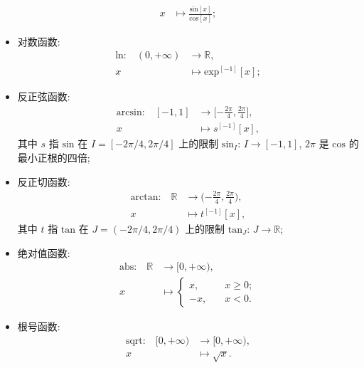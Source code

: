 \begin{definition}
\begin{itemize}
\begin{align*}
                  x                                      & \mapsto \frac{\mathrm{sin} {[x]}} {\mathrm{cos} {[x]}};
              \end{align*}
        \item 对数函数:
              \begin{align*}
                  \text{$\mathrm{ln}$:} \quad
                  (0, +\infty) & \to \mathbb{R},                    \\
                  x            & \mapsto \mathrm{exp}^{[-1]} {[x]};
              \end{align*}
        \item 反正弦函数:
              \begin{align*}
                  \text{$\mathrm{arcsin}$:} \quad
                  [-1, 1] & \to \bigg[ {-\frac{2\pi}{4}}, \frac{2\pi}{4} \bigg], \\
                  x       & \mapsto s^{[-1]} {[x]},
              \end{align*}
              其中 $s$ 指 $\mathrm{sin}$ 在
              $I = [-2\pi/4, 2\pi/4]$ 上的限制
              $\mathrm{sin}_I$: $I \to [-1, 1]$,
              $2\pi$ 是 $\mathrm{cos}$ 的最小正根的四倍;
        \item 反正切函数:
              \begin{align*}
                  \text{$\mathrm{arctan}$:} \quad
                  \mathbb{R} & \to \bigg( {-\frac{2\pi}{4}}, \frac{2\pi}{4} \bigg), \\
                  x          & \mapsto t^{[-1]} {[x]},
              \end{align*}
              其中 $t$ 指 $\mathrm{tan}$ 在
              $J = (-2\pi/4, 2\pi/4)$ 上的限制
              $\mathrm{tan}_J$: $J \to \mathbb{R}$;
        \item 绝对值函数:
              \begin{align*}
                  \text{$\mathrm{abs}$:} \quad
                  \mathbb{R} & \to [0, +\infty),             \\
                  x          & \mapsto \begin{cases}
                                           x,  & \quad x \geq 0; \\
                                           -x, & \quad x < 0.
                                       \end{cases}
              \end{align*}
        \item 根号函数:
              \begin{align*}
                  \text{$\mathrm{sqrt}$:} \quad
                  [0, +\infty) & \to [0, +\infty), \\
                  x            & \mapsto \sqrt{x}.
              \end{align*}
    \end{itemize}
\end{definition}

